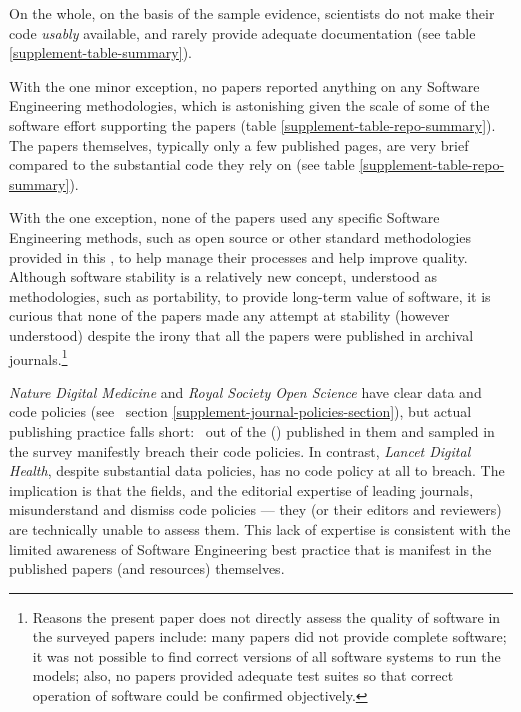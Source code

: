 \documentclass[10pt,a4paper]{article}
\begin{document}
On the whole, on the basis of the sample evidence, scientists do not make their code \emph{usably\/} available, and rarely provide adequate documentation (see table \ref{supplement-table-summary}). 

With the one minor exception, no papers reported anything on any Software Engineering methodologies, which is astonishing given the scale of some of the software effort supporting the papers (table \ref{supplement-table-repo-summary}).  The papers themselves, typically only a few published pages, are very brief compared to the substantial code they rely on (see table \ref{supplement-table-repo-summary}). 

With the one exception, none of the papers used any specific Software Engineering methods, such as open source \cite{open-source} or other standard methodologies provided in this \supplement, to help manage their processes and help improve quality. Although software stability \cite{stability} is a relatively new concept, understood as methodologies, such as portability, to provide long-term value of software, it is curious that none of the papers made any attempt at stability (however understood) despite the irony that all the papers were published in archival journals.\footnote{Reasons the present paper does not directly assess the quality of software in the surveyed papers include: many papers did not provide complete software; it was not possible to find correct versions of all software systems to run the models; also, no papers provided adequate test suites so that correct operation of software could be confirmed objectively.}

\emph{Nature Digital Medicine\/} and \emph{Royal Society Open Science\/} have clear data and code policies (see \supplement\ section \ref{supplement-journal-policies-section}), but actual publishing practice falls short: \the\countHasBreach\ out of the  (\pc{\countHasBreach}{\countHasPolicy}) published in them and sampled in the survey manifestly breach their code policies. In contrast, \emph{Lancet Digital Health\/}, despite substantial data policies, has no code policy at all to breach. The implication is that the fields, and the editorial expertise of leading journals, misunderstand and dismiss code policies --- they (or their editors and reviewers) are technically unable to assess them. This lack of expertise is consistent with the limited awareness of Software Engineering best practice that is manifest in the published papers (and resources) themselves.
\end{document}
